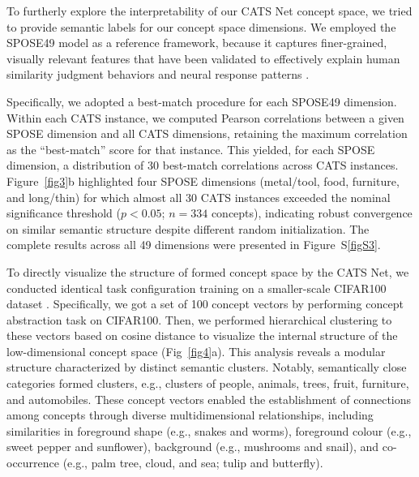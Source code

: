 \documentclass[pdflatex,sn-mathphys-num,lineno]{sn-jnl}%
\begin{document}
\begin{CJK}{UTF8}{gbsn}
To furtherly explore the interpretability of our CATS Net concept space, we tried to provide semantic labels for our concept space dimensions. We employed the SPOSE49 model as a reference framework, because it captures finer-grained, visually relevant features that have been validated to effectively explain human similarity judgment behaviors \cite{hebart_revealing_2020} and neural response patterns \cite{contier_distributed_2024}. 

Specifically, we adopted a best-match procedure for each SPOSE49 dimension. Within each CATS instance, we computed Pearson correlations between a given SPOSE dimension and all CATS dimensions, retaining the maximum correlation as the “best-match” score for that instance. This yielded, for each SPOSE dimension, a distribution of 30 best-match correlations across CATS instances. Figure~\ref{fig3}b highlighted four SPOSE dimensions (metal/tool, food, furniture, and long/thin) for which almost all 30 CATS instances exceeded the nominal significance threshold ($p < 0.05$; $n = 334$ concepts), indicating robust convergence on similar semantic structure despite different random initialization. The complete results across all 49 dimensions were presented in Figure~S\ref{figS3}.

To directly visualize the structure of formed concept space by the CATS Net, we conducted identical task configuration training on a smaller-scale CIFAR100 dataset \cite{krizhevsky_learning_2009}. Specifically, we got a set of 100 concept vectors by performing concept abstraction task on CIFAR100. Then, we performed hierarchical clustering to these vectors based on cosine distance to visualize the internal structure of the low-dimensional concept space (Fig~\ref{fig4}a). This analysis reveals a modular structure characterized by distinct semantic clusters. Notably, semantically close categories formed clusters, e.g., clusters of people, animals, trees, fruit, furniture, and automobiles. These concept vectors enabled the establishment of connections among concepts through diverse multidimensional relationships, including similarities in foreground shape (e.g., snakes and worms), foreground colour (e.g., sweet pepper and sunflower), background (e.g., mushrooms and snail), and co-occurrence (e.g., palm tree, cloud, and sea; tulip and butterfly).


\end{CJK}
\end{document}
